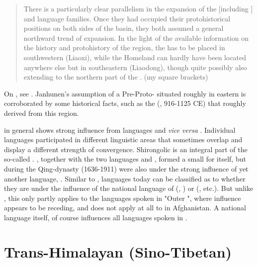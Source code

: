 \begin{quote}
There is a particularly clear parallelism in the expansion of the  [including ] and  language families. Once they had occupied their protohistorical positions on both sides of the  basin, they both assumed a general northward trend of expansion. In the light of the available information on the history and protohistory of the region, the   has to be placed in southwestern  (Liaoxi), while the  Homeland can hardly have been located anywhere else but in southeastern  (Liaodong), though quite possibly also extending to the northern part of the . (my square brackets)
\end{quote}

\noindent On , see . Janhunen’s assumption of a Pre-Proto-  situated roughly in eastern  is corroborated by some historical facts, such as the   (, 916-1125 CE) that roughly derived from this region.

 in general shows strong influence from  languages and \textit{vice versa} \citep{Schönig2003}. Individual  languages participated in different linguistic areas that sometimes overlap and display a different strength of convergence. Shirongolic is an integral part of the so-called . , together with the two  languages  and , formed a small  for itself, but during the Qing-dynasty (1636-1911) were also under the strong influence of yet another  language, . Similar to ,  languages today can be classified as to whether they are under the influence of the national language of  (, ) or  (,  etc.). But unlike , this only partly applies to the  languages spoken in "Outer ", where  influence appears to be receding, and does not apply at all to  in Afghanistan. A national language itself,  of course influences all  languages spoken in .

\section{Trans-Himalayan (Sino-Tibetan)}\label{sec:2.9}

